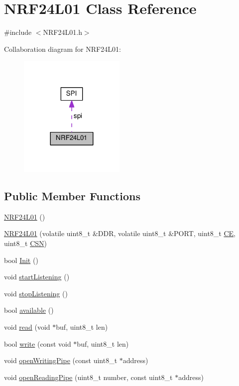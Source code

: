 \hypertarget{classNRF24L01}{}\section{N\+R\+F24\+L01 Class Reference}
\label{classNRF24L01}


{\ttfamily \#include $<$N\+R\+F24\+L01.\+h$>$}



Collaboration diagram for N\+R\+F24\+L01\+:\nopagebreak
\begin{figure}[H]
\begin{center}
\leavevmode
\includegraphics[width=144pt]{classNRF24L01__coll__graph}
\end{center}
\end{figure}
\subsection*{Public Member Functions}
\begin{DoxyCompactItemize}
\item 
\hyperlink{classNRF24L01_ad3e6263e0afaa974637d1450b6c8cb37}{N\+R\+F24\+L01} ()
\item 
\hyperlink{classNRF24L01_a8e2cc2ca751ff3bd4ea351bd2fcea93e}{N\+R\+F24\+L01} (volatile uint8\+\_\+t \&D\+DR, volatile uint8\+\_\+t \&P\+O\+RT, uint8\+\_\+t \hyperlink{main_8cpp_af332f65aca07c44deeda884c8f6c353c}{CE}, uint8\+\_\+t \hyperlink{main_8cpp_a8df4f3a8a2035df063402ae5f0c1d2f8}{C\+SN})
\item 
bool \hyperlink{classNRF24L01_a2973773d1a158e1cfbf52198f248c548}{Init} ()
\item 
void \hyperlink{classNRF24L01_aaabd39829998b609c0dc317af4f141b2}{start\+Listening} ()
\item 
void \hyperlink{classNRF24L01_a6ad13189b732f237ac148c659ddf6b01}{stop\+Listening} ()
\item 
bool \hyperlink{classNRF24L01_ab368039cf5448f0ff5d489563d530c7b}{available} ()
\item 
void \hyperlink{classNRF24L01_a60ed6c6e072a1f41ca560546745ec6da}{read} (void $\ast$buf, uint8\+\_\+t len)
\item 
bool \hyperlink{classNRF24L01_a719390c69a2e45df08379f17e3289f4c}{write} (const void $\ast$buf, uint8\+\_\+t len)
\item 
void \hyperlink{classNRF24L01_ad64a887cae746be5ca43cf08445feed9}{open\+Writing\+Pipe} (const uint8\+\_\+t $\ast$address)
\item 
void \hyperlink{classNRF24L01_a9b458f77f6ae6c42f330710e703dd847}{open\+Reading\+Pipe} (uint8\+\_\+t number, const uint8\+\_\+t $\ast$address)
\end{DoxyCompactItemize}
